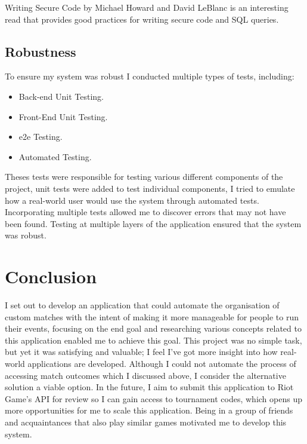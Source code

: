 Writing Secure Code\cite{howard2003writing} by Michael Howard and David LeBlanc is an interesting read that provides good practices for writing secure code and SQL queries.

\section{Robustness}
To ensure my system was robust I conducted multiple types of tests, including:

\begin{itemize}
	\item Back-end Unit Testing.
	\item Front-End Unit Testing.
	\item e2e Testing.
	\item Automated Testing.
\end{itemize}

Theses tests were responsible for testing various different components of the project, unit tests were added to test individual components, I tried to emulate how a real-world user would use the system through automated tests.\newline
Incorporating multiple tests allowed me to discover errors that may not have been found. Testing at multiple layers of the application ensured that the system was robust.
\chapter{Conclusion}
I set out to develop an application that could automate the organisation of custom matches with the intent of making it more manageable for people to run their events, focusing on the end goal and researching various concepts related to this application enabled me to achieve this goal. This project was no simple task, but yet it was satisfying and valuable; I feel I've got more insight into how real-world applications are developed.  Although I could not automate the process of accessing match outcomes which I discussed above, I consider the alternative solution a viable option. In the future, I aim to submit this application to Riot Game's API for review so I can gain access to tournament codes, which opens up more opportunities for me to scale this application. Being in a group of friends and acquaintances that also play similar games motivated me to develop this system.


